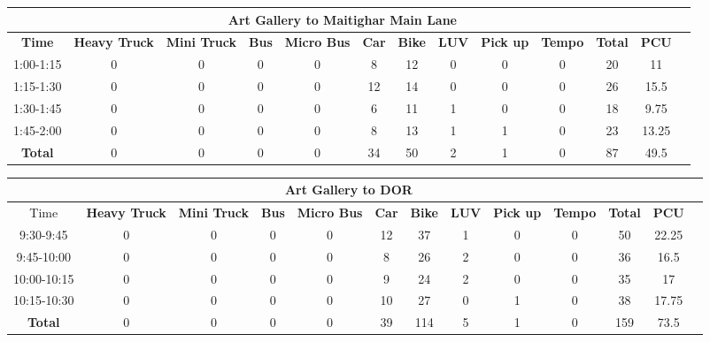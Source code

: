 \begin{landscape}
\centering
\begin{table}[h!]
\centering
\begin{tabular}{|c|c|c|c|c|c|c|c|c|c|c|c|c|}
    \hline
    \multicolumn{12}{|c|}{\textbf{Art Gallery to Maitighar Main Lane}} \\
    \hline
    \textbf{Time} & \textbf{Heavy Truck} & \textbf{Mini Truck} & \textbf{Bus} & \textbf{Micro Bus} & \textbf{Car} & \textbf{Bike} & \textbf{LUV} & \textbf{Pick up} & \textbf{Tempo} & \textbf{\textbf{Total}} & \textbf{PCU} \\
    \hline
1:00-1:15	&0	&0	&0	&0	&8	&12	&0	&0	&0	&20	&11 \\ \hline
1:15-1:30	&0	&0	&0	&0	&12	&14	&0	&0	&0	&26	&15.5 \\ \hline
1:30-1:45	&0	&0	&0	&0	&6	&11	&1	&0	&0	&18	&9.75 \\ \hline
1:45-2:00	&0	&0	&0	&0	&8	&13	&1	&1	&0	&23	&13.25 \\ \hline
\textbf{Total}	&0	&0	&0	&0	&34	&50	&2	&1	&0	&87	&49.5 \\ \hline

\end{tabular}

\vspace{0.5cm}

\begin{tabular}{|c|c|c|c|c|c|c|c|c|c|c|c|c|}
    \hline
    \multicolumn{12}{|c|}{\textbf{Art Gallery to DOR}} \\
    \hline
        Time & \textbf{Heavy Truck} & \textbf{Mini Truck} & \textbf{Bus} & \textbf{Micro Bus} & \textbf{Car} & \textbf{Bike} & \textbf{LUV} & \textbf{Pick up} & \textbf{Tempo} & \textbf{\textbf{Total}} & \textbf{PCU} \\
    \hline
9:30-9:45	&0	&0	&0	&0	&12	&37	&1	&0	&0	&50	&22.25 \\ \hline
9:45-10:00	&0	&0	&0	&0	&8	&26	&2	&0	&0	&36	&16.5 \\ \hline
10:00-10:15	&0	&0	&0	&0	&9	&24	&2	&0	&0	&35	&17 \\ \hline
10:15-10:30	&0	&0	&0	&0	&10	&27	&0	&1	&0	&38	&17.75 \\ \hline
\textbf{Total}	&0	&0	&0	&0	&39	&114	&5	&1	&0	&159	&73.5 \\ \hline


\end{tabular}


\end{table}
\end{landscape}
